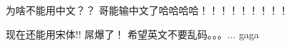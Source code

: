 \documentclass{article}
\begin{document}
\begin{CJK}{UTF8}{wqy-zenhei}
为啥不能用中文？？
哥能输中文了哈哈哈哈！！！！！！！！！
\end{CJK}
\begin{CJK}{UTF8}{song}
现在还能用宋体!! 屌爆了！
希望英文不要乱码。。。...
gaga
\end{CJK}
\end{document}

